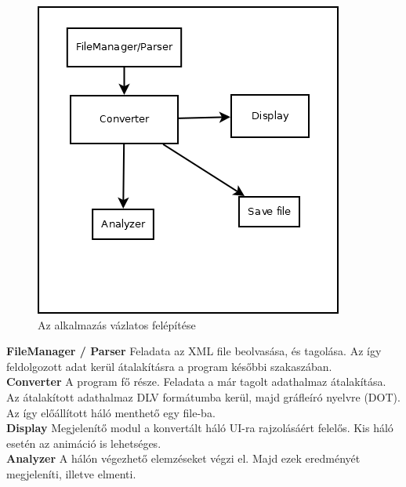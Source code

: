 \begin{figure}[h!]
\centering
\includegraphics[scale=0.6]{images/scheme.png}
\caption{Az alkalmazás vázlatos felépítése}
\label{fig:scheme}
\end{figure}

\textbf{FileManager / Parser } Feladata az XML file beolvasása, és tagolása. Az így feldolgozott adat kerül átalakításra a program későbbi szakaszában.\\
\textbf{Converter} A program fő része. Feladata a már tagolt adathalmaz átalakítása. Az átalakított adathalmaz DLV formátumba kerül, majd gráfleíró nyelvre (DOT). Az így előállított háló menthető egy file-ba.\\
\textbf{Display} Megjelenítő modul a konvertált háló UI-ra rajzolásáért felelős. Kis háló esetén az animáció is lehetséges.\\
\textbf{Analyzer} A hálón végezhető elemzéseket végzi el. Majd ezek eredményét megjeleníti, illetve elmenti. 

